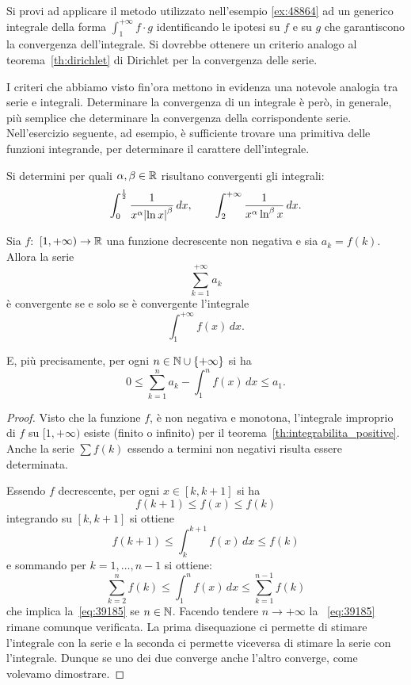 \begin{exercise}
  Si provi ad applicare il metodo utilizzato nell'esempio \ref{ex:48864} ad 
  un generico integrale della forma $\int_1^{+\infty} f\cdot g$ identificando le ipotesi 
  su $f$ e su $g$ che garantiscono la convergenza dell'integrale.
  Si dovrebbe ottenere un criterio analogo al teorema~\ref{th:dirichlet} di Dirichlet
  per la convergenza delle serie.
\end{exercise}


I criteri che abbiamo visto fin'ora mettono in evidenza una notevole
analogia tra serie e integrali. Determinare la convergenza
di un integrale è però, in generale, più semplice che determinare
la convergenza della corrispondente serie.
Nell'esercizio seguente, ad esempio, è sufficiente trovare una primitiva
delle funzioni integrande, per determinare il carattere dell'integrale.

\begin{exercise}
Si determini per quali $\alpha,\beta\in \mathbb R$ risultano convergenti
gli integrali:
\[
  \int_0^{\frac 1 2} \frac{1}{x^\alpha {\left|\ln x\right|}^\beta}\, dx,
  \qquad
  \int_2^{+\infty} \frac{1}{x^\alpha \ln^\beta x} \, dx.
\]
\end{exercise}

\begin{theorem}
\mymark{**}
Sia $f\colon$ $[1,+\infty)\to \mathbb R$ una funzione decrescente non negativa
e sia $a_k=f(k)$.
Allora la serie
\[
   \sum_{k=1}^{+\infty} a_k
\]
è convergente se e solo se è convergente l'integrale
\[
  \int_1^{+\infty} f(x)\, dx.
\]

E, più precisamente, per ogni $n\in \mathbb N\cup{\left\{ +\infty \right\}}$ si ha
\begin{equation}\label{eq:39185}
  0
  \le \sum_{k=1}^{n} a_k - \int_1^{n}f(x)\, dx
  \le a_1.
\end{equation}

\end{theorem}
%
\begin{proof}
\mymark{**}
Visto che la funzione $f$, è non negativa e monotona,
l'integrale improprio di $f$ su $[1,+\infty)$ esiste (finito o infinito)
per il teorema~\ref{th:integrabilita_positive}.
Anche la serie $\sum f(k)$ essendo a termini non negativi risulta essere determinata.

Essendo $f$ decrescente, per ogni $x \in [k,k+1]$ si ha
\[
  f(k+1) \le f(x) \le f(k)
\]
integrando su $[k,k+1]$ si ottiene
\[
  f(k+1) \le \int_{k}^{k+1} f(x)\, dx \le f(k)
\]
e sommando per $k=1,\dots, n-1$ si ottiene:
\[
  \sum_{k=2}^{n} f(k) \le \int_{1}^{n} f(x)\, dx \le \sum_{k=1}^{n-1} f(k)
\]
che implica la~\eqref{eq:39185} se $n\in \mathbb N$. Facendo
tendere $n\to+\infty$ la ~\eqref{eq:39185} rimane comunque verificata.
La prima disequazione ci permette di stimare l'integrale con la serie
e la seconda ci permette viceversa di stimare la serie con l'integrale.
Dunque se uno dei due converge anche l'altro converge, come volevamo dimostrare.
\end{proof}

